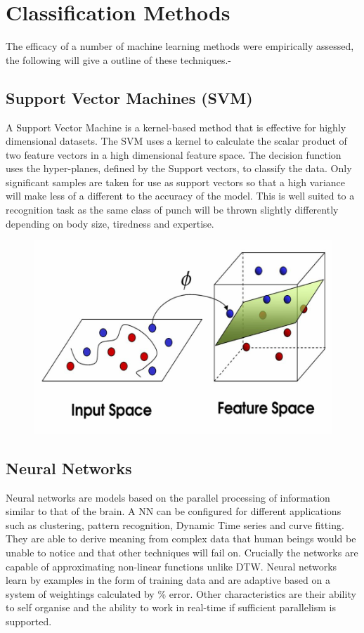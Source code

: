 \section{Classification Methods}
The efficacy of a number of machine learning methods were empirically assessed, the following will give a outline of these techniques.-

\subsection{Support Vector Machines (SVM)}
A Support Vector Machine is a kernel-based method that is effective for highly dimensional datasets. The SVM uses a kernel to calculate the scalar product of two feature vectors in a high dimensional feature space. The decision function uses the hyper-planes, defined by the Support  vectors,  to  classify  the  data.  Only  significant  samples  are  taken  for  use  as support vectors so that a high variance will make less of a different to the accuracy of the model. This is well suited to a recognition task as the same class of punch will be thrown slightly differently depending on body size, tiredness and expertise.

\begin{figure}[h]
    \centering
    \includegraphics[height=0.25\textheight]{fig02/svm.png}
\end{figure}

\subsection{Neural Networks} 
Neural networks are models based on the parallel processing of information similar to that of the brain. A NN can be configured for different applications such as clustering, pattern recognition, Dynamic Time series and curve fitting. They are able to derive meaning from complex data that human beings would be unable to notice and that other techniques will fail on. Crucially the networks are capable of approximating non-linear functions unlike DTW. Neural networks learn by examples in the form of training data and are adaptive based on a system of weightings calculated by \% error. Other characteristics are their ability to self organise and the ability to work in real-time if sufficient parallelism is supported.


